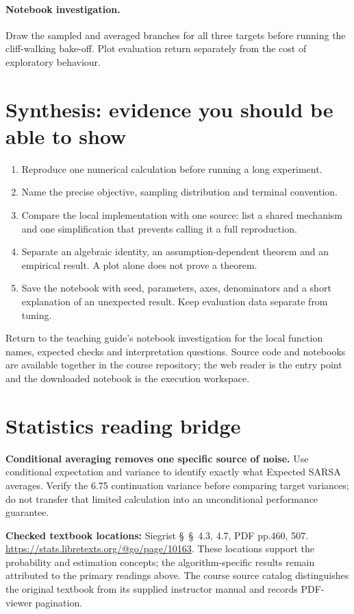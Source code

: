 \documentclass[11pt]{scrartcl}
\begin{document}
\paragraph{Notebook investigation.} Draw the sampled and averaged branches for all three targets before running the cliff-walking bake-off. Plot evaluation return separately from the cost of exploratory behaviour.

\section*{Synthesis: evidence you should be able to show}
\begin{enumerate}
\item Reproduce one numerical calculation before running a long experiment.
\item Name the precise objective, sampling distribution and terminal convention.
\item Compare the local implementation with one source: list a shared mechanism
and one simplification that prevents calling it a full reproduction.
\item Separate an algebraic identity, an assumption-dependent theorem and an
empirical result. A plot alone does not prove a theorem.
\item Save the notebook with seed, parameters, axes, denominators and a short
explanation of an unexpected result. Keep evaluation data separate from tuning.
\end{enumerate}
Return to the teaching guide's notebook investigation for the local function
names, expected checks and interpretation questions. Source code and notebooks
are available together in the course repository; the web reader is the entry
point and the downloaded notebook is the execution workspace.
\section*{Statistics reading bridge}
\textbf{Conditional averaging removes one specific source of noise.} Use conditional expectation and variance to identify exactly what Expected SARSA averages. Verify the 6.75 continuation variance before comparing target variances; do not transfer that limited calculation into an unconditional performance guarantee.

\textbf{Checked textbook locations:} Siegrist \S~\S~4.3, 4.7, PDF pp.460, 507. \url{https://stats.libretexts.org/@go/page/10163}. These locations support the probability and estimation concepts; the algorithm-specific results remain attributed to the primary readings above. The course source catalog distinguishes the original textbook from its supplied instructor manual and records PDF-viewer pagination.
\end{document}
